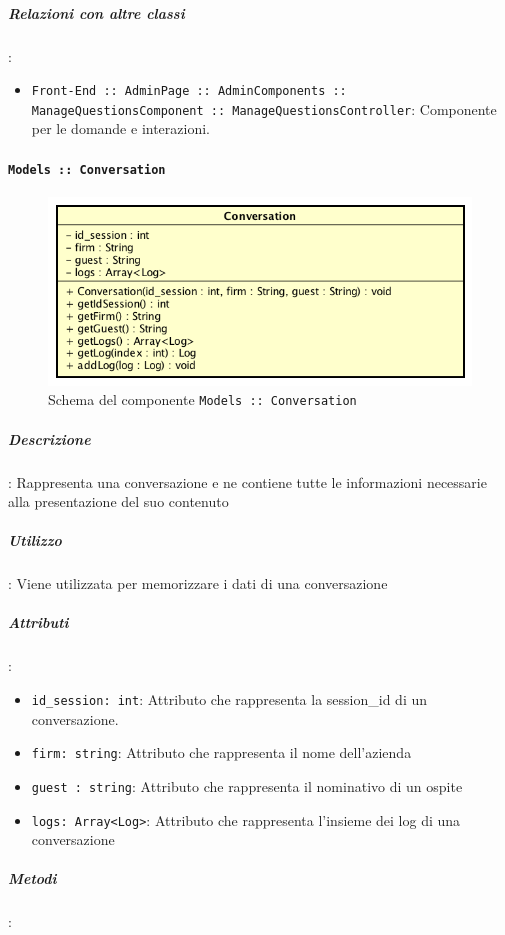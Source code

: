 \documentclass[../DefinizioneDiProdotto_v3.0.0.tex]{subfiles}
\begin{document}
		\subparagraph{Relazioni con altre classi}:
		      \begin{itemize}
		      	\item \texttt{Front-End :: AdminPage :: AdminComponents :: ManageQuestionsComponent :: ManageQuestionsController}: Componente per le domande e interazioni.
		      \end{itemize}


\newpage
	\paragraph{\texttt{Models :: Conversation}}
	\acapo
	\begin{figure}[!h]
		\centering
		\includegraphics[scale=0.7]{Architettura/Front-End/Models/Conversation.png}
		\caption{Schema del componente \texttt{Models :: Conversation}}
	\end{figure}
		\subparagraph{Descrizione}: Rappresenta una conversazione e ne contiene tutte le informazioni necessarie alla presentazione del suo contenuto
		\subparagraph{Utilizzo}: Viene utilizzata per memorizzare i dati di una conversazione
		\subparagraph{Attributi}:
				\begin{itemize}
					\item \texttt{id\_session: int}: Attributo che rappresenta la session\_id di un conversazione.

					\item \texttt{firm: string}: Attributo che rappresenta il nome dell'azienda

					\item \texttt{guest : string}: Attributo che rappresenta il nominativo di un ospite

					\item \texttt{logs: Array<Log>}: Attributo che rappresenta l'insieme dei log di una conversazione
				\end{itemize}
			\subparagraph{Metodi}:
\end{document}
